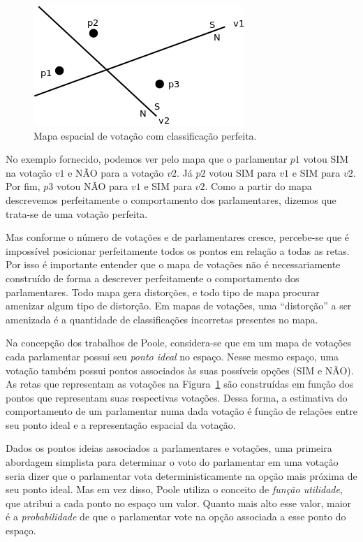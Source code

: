 \documentclass[a4paper, 12pt]{article}
\newcommand\nay{NÃO\xspace}
\newcommand\yea{SIM\xspace}
\begin{document}
\begin{figure}[h]
  \centering
  \includegraphics[scale=0.7]{figs/votacao-perfeita.png}
  \caption{Mapa espacial de votação com classificação perfeita.}
  \label{fig:mapa-classificacao-perfeita}
\end{figure}

No exemplo fornecido, podemos ver pelo mapa que o parlamentar $p1$ votou \yea na votação $v1$ e \nay para a votação $v2$. Já $p2$ votou \yea para $v1$ e \yea para $v2$. Por fim, $p3$ votou \nay para $v1$ e \yea para $v2$. Como a partir do mapa descrevemos perfeitamente o comportamento dos parlamentares, dizemos que trata-se de uma votação perfeita.

Mas conforme o número de votações e de parlamentares cresce, percebe-se que é impossível posicionar perfeitamente todos os pontos em relação a todas as retas. Por isso é importante entender que o mapa de votações não é necessariamente construído de forma a descrever perfeitamente o comportamento dos parlamentares. Todo mapa gera distorções, e todo tipo de mapa procurar amenizar algum tipo de distorção. Em mapas de votações, uma ``distorção'' a ser amenizada é a quantidade de classificações incorretas presentes no mapa.

Na concepção dos trabalhos de Poole, considera-se que em um mapa de votações cada parlamentar possui seu \emph{ponto ideal} no espaço. Nesse mesmo espaço, uma votação também possui pontos associados às suas possíveis opções (\yea e \nay). As retas que representam as votações na Figura~\ref{fig:mapa-classificacao-perfeita} são construídas em função dos pontos que representam suas respectivas votações. Dessa forma, a estimativa do comportamento de um parlamentar numa dada votação é função de relações entre seu ponto ideal e a representação espacial da votação. 

Dados os pontos ideias associados a parlamentares e votações, uma primeira abordagem simplista para determinar o voto do parlamentar em uma votação seria dizer que o parlamentar vota deterministicamente na opção mais próxima de seu ponto ideal. Mas em vez disso, Poole utiliza o conceito de \emph{função utilidade}, que atribui a cada ponto no espaço um valor. Quanto mais alto esse valor, maior é a \emph{probabilidade} de que o parlamentar vote na opção associada a esse ponto do espaço. 
\end{document}
